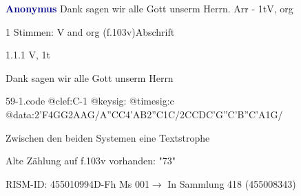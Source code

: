\documentclass[twocolumn]{book}
\begin{document}
\par \vspace{7pt} \textcolor{darkblue}{\textbf{Anonymus  }}\hfillplus{\textbf{[59]}}\newline Dank sagen wir alle Gott unserm Herrn. Arr - 1t\newline V, org
\par \begin{itshape}\end{itshape} 
\par \textcolor{darkblue}{}  1 Stimmen: V and org  (f.103v)\newline Abschrift
\par 1.1.1  V, 1t\newline \begin{footnotesize} Dank sagen wir alle Gott unserm Herrn \end{footnotesize}  
\begin{filecontents*}{59-1.code}
@clef:C-1
@keysig:
@timesig:c
@data:2'F4GG2AAG/A''CC4'AB2''C1C/2CCDC'G''C'B''C'A1G/
\end{filecontents*}
\newline
%
\par Zwischen den beiden Systemen eine Textstrophe
\par Alte Zählung auf f.103v vorhanden: "73"
\par RISM-ID: 455010994\newline D-Fh  Ms 001\newline $\rightarrow$ In Sammlung 418 (455008343)
      
\end{document}
